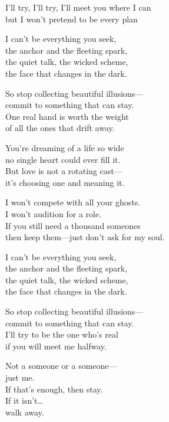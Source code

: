 \begin{lyrics}
I’ll try, I’ll try, I’ll meet you where I can\\
but I won’t pretend to be every plan

I can’t be everything you seek,\\
the anchor and the fleeting spark,\\
the quiet talk, the wicked scheme,\\
the face that changes in the dark.

So stop collecting beautiful illusions—\\
commit to something that can stay.\\
One real hand is worth the weight\\
of all the ones that drift away.

You’re dreaming of a life so wide\\
no single heart could ever fill it.\\
But love is not a rotating cast—\\
it’s choosing one and meaning it.

I won’t compete with all your ghosts.\\
I won’t audition for a role.\\
If you still need a thousand someones\\
then keep them—just don’t ask for my soul.

I can’t be everything you seek,\\
the anchor and the fleeting spark,\\
the quiet talk, the wicked scheme,\\
the face that changes in the dark.

So stop collecting beautiful illusions—\\
commit to something that can stay.\\
I’ll try to be the one who’s real\\
if you will meet me halfway.

Not a someone or a someone—\\
just me.\\
If that’s enough, then stay.\\
If it isn’t…\\
walk away.
\end{lyrics}

